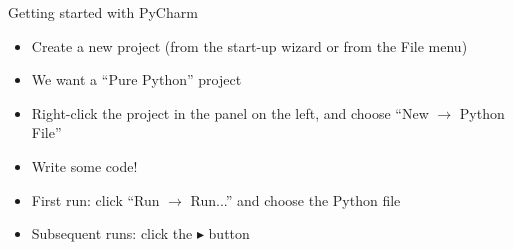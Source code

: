 \begin{frame}{Getting started with PyCharm}
	\begin{itemize}
		\pause\item Create a new project (from the start-up wizard or from the File menu)
		\pause\item We want a ``Pure Python'' project
		\pause\item Right-click the project in the panel on the left, and choose ``New $\to$ Python File''
		\pause\item Write some code!
		\pause\item First run: click ``Run $\to$ Run...'' and choose the Python file
		\pause\item Subsequent runs: click the $\blacktriangleright$ button
	\end{itemize}
\end{frame}

